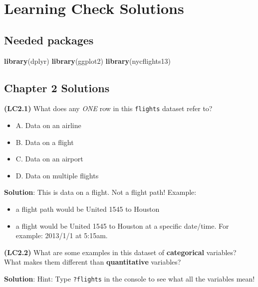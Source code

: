 \documentclass[12pt,]{krantz}
\makeatletter
\newenvironment{Shaded}{\begin{snugshade}}{\end{snugshade}}
\newcommand{\KeywordTok}[1]{\textcolor[rgb]{0.27,0.27,0.27}{\textbf{#1}}}
\newcommand{\NormalTok}[1]{#1}
\providecommand{\tightlist}{%
  \setlength{\itemsep}{0pt}\setlength{\parskip}{0pt}}
\newenvironment{kframe}{%
\medskip{}
\setlength{\fboxsep}{.8em}
 \def\at@end@of@kframe{}%
 \ifinner\ifhmode%
  \def\at@end@of@kframe{\end{minipage}}%
  \begin{minipage}{\columnwidth}%
 \fi\fi%
 \def\FrameCommand##1{\hskip\@totalleftmargin \hskip-\fboxsep
 \colorbox{shadecolor}{##1}\hskip-\fboxsep
     \hskip-\linewidth \hskip-\@totalleftmargin \hskip\columnwidth}%
 \MakeFramed {\advance\hsize-\width
   \@totalleftmargin\z@ \linewidth\hsize
   \@setminipage}}%
 {\par\unskip\endMakeFramed%
 \at@end@of@kframe}
\renewenvironment{Shaded}{\begin{kframe}}{\end{kframe}}
\makeatother
\begin{document}
\chapter{Learning Check Solutions}\label{appendixD}

\section{Needed packages}\label{needed-packages-12}

\begin{Shaded}
\begin{Highlighting}[]
\KeywordTok{library}\NormalTok{(dplyr)}
\KeywordTok{library}\NormalTok{(ggplot2)}
\KeywordTok{library}\NormalTok{(nycflights13)}
\end{Highlighting}
\end{Shaded}

\section{Chapter 2 Solutions}\label{chapter-2-solutions}

\textbf{(LC2.1)} What does any \emph{ONE} row in this \texttt{flights}
dataset refer to?

\begin{itemize}
\tightlist
\item
  A. Data on an airline
\item
  B. Data on a flight
\item
  C. Data on an airport
\item
  D. Data on multiple flights
\end{itemize}

\textbf{Solution}: This is data on a flight. Not a flight path! Example:

\begin{itemize}
\tightlist
\item
  a flight path would be United 1545 to Houston
\item
  a flight would be United 1545 to Houston at a specific date/time. For
  example: 2013/1/1 at 5:15am.
\end{itemize}

\textbf{(LC2.2)} What are some examples in this dataset of
\textbf{categorical} variables? What makes them different than
\textbf{quantitative} variables?

\textbf{Solution}: Hint: Type \texttt{?flights} in the console to see
what all the variables mean!
\end{document}

